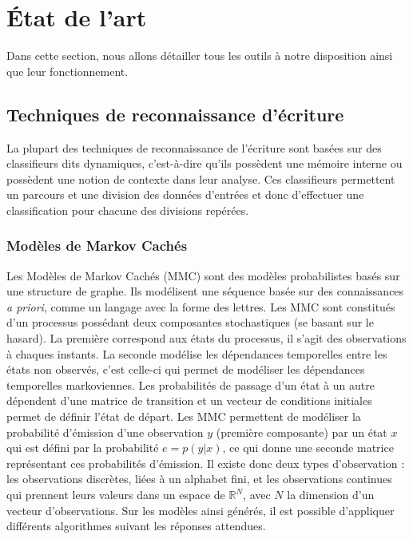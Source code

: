 \chapter{État de l'art}

Dans cette section, nous allons détailler tous les outils à notre disposition ainsi que leur fonctionnement.

\section{Techniques de reconnaissance d’écriture}

La plupart des techniques de reconnaissance de l’écriture sont basées sur des classifieurs
dits dynamiques, c’est-à-dire qu’ils possèdent une mémoire interne ou possèdent une notion
de contexte dans leur analyse. Ces classifieurs permettent un parcours et une division des
données d’entrées et donc d’effectuer une classification pour chacune des divisions repérées. 
		
\subsection{Modèles de Markov Cachés}

Les Modèles de Markov Cachés (MMC) sont des modèles probabilistes basés sur une structure de graphe.
Ils modélisent une séquence basée sur des connaissances \textit{a priori}, comme un langage avec la
forme des lettres. Les MMC sont constitués d’un processus possédant deux composantes stochastiques
(se basant sur le hasard). La première correspond aux états du processus, il s’agit des
observations à chaques instants. La seconde modélise les dépendances temporelles entre les
états non observés, c’est celle-ci qui permet de modéliser les dépendances temporelles markoviennes. 
Les probabilités de passage d’un état à un autre dépendent d’une matrice de transition
et un vecteur de conditions initiales permet de définir l’état de départ. Les MMC permettent de
modéliser la probabilité d’émission d’une observation $y$ (première composante) par un état $x$ qui
est défini par la probabilité $e = p(y|x)$, ce qui donne une seconde matrice représentant
ces probabilités d’émission. Il existe donc deux types d’observation : les observations discrètes,
liées à un alphabet fini, et les observations continues qui prennent leurs valeurs dans un espace de
$\mathbb{R}^N$, avec $N$ la dimension d’un vecteur d’observations. Sur les modèles ainsi générés,
il est possible d’appliquer différents algorithmes suivant les réponses attendues.

